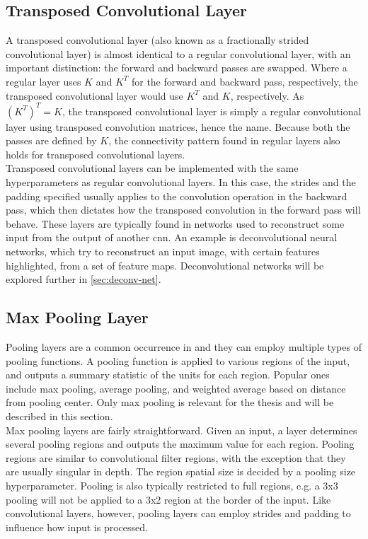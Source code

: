 \subsection{Transposed Convolutional Layer} \label{sec:trans-conv}

A transposed convolutional layer (also known as a fractionally strided convolutional layer) is almost identical to a regular convolutional layer, with an important distinction: the forward and backward passes are swapped. Where a regular layer uses $K$ and $K^T$ for the forward and backward pass, respectively, the transposed convolutional layer would use $K^T$ and $K$, respectively. As $(K^T)^T=K$, the transposed convolutional layer is simply a regular convolutional layer using transposed convolution matrices, hence the name. Because both the passes are defined by $K$, the connectivity pattern found in regular layers also holds for transposed convolutional layers. \\

\noindent Transposed convolutional layers can be implemented with the same hyperparameters as regular convolutional layers. In this case, the strides and the padding specified usually applies to the convolution operation in the backward pass, which then dictates how the transposed convolution in the forward pass will behave. These layers are typically found in networks used to reconstruct some input from the output of another \acrshort{cnn}. An example is deconvolutional neural networks, which try to reconstruct an input image, with certain features highlighted, from a set of feature maps. Deconvolutional networks will be explored further in \autoref{sec:deconv-net}.

\subsection{Max Pooling Layer}

Pooling layers are a common occurrence in  and they can employ multiple types of pooling functions. A pooling function is applied to various regions of the input, and outputs a summary statistic of the units for each region. Popular ones include max pooling, average pooling, and weighted average based on distance from pooling center. Only max pooling is relevant for the thesis and will be described in this section. \\

\noindent Max pooling layers are fairly straightforward. Given an input, a layer determines several pooling regions and outputs the maximum value for each region. Pooling regions are similar to convolutional filter regions, with the exception that they are usually singular in depth. The region spatial size is decided by a pooling size hyperparameter. Pooling is also typically restricted to full regions, e.g. a 3x3 pooling will not be applied to a 3x2 region at the border of the input. Like convolutional layers, however, pooling layers can employ strides and padding to influence how input is processed.

